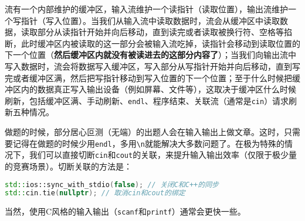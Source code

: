 流有一个内部维护的缓冲区，输入流维护一个读指针（读取位置），输出流维护一个写指针（写入位置）。当我们从输入流中读取数据时，流会从缓冲区中读取数据，读取部分从读指针开始并向后移动，直到读完或者读取被换行符、空格等掐断，此时缓冲区内被读取的这一部分会被输入流吃掉，读指针会移动到读取位置的下一个位置（\textbf{然后缓冲区内就没有被读进去的这部分内容了}）；当我们向输出流中写入数据时，流会将数据写入缓冲区，写入部分从写指针开始并向后移动，直到写完或者缓冲区满，然后把写指针移动到写入位置的下一个位置；至于什么时候把缓冲区内的数据真正写入输出设备（例如屏幕、文件等），这取决于缓冲区什么时候刷新，包括缓冲区满、手动刷新、\texttt{endl}、程序结束、关联流（通常是\texttt{cin}）请求刷新五种情况。

做题的时候，部分居心叵测（无端）的出题人会在输入输出上做文章。这时，只需要记得在做题的时候少用\texttt{endl}，多用\texttt{\textbackslash n}就能解决大多数问题了。在极为特殊的情况下，我们可以直接切断\texttt{cin}和\texttt{cout}的关联，来提升输入输出效率（仅限于极少量的竞赛场景）。切断关联的方法是：
\begin{lstlisting}[language=C++]
std::ios::sync_with_stdio(false); // 关闭C和C++的同步
std::cin.tie(nullptr); // 取消cin和cout的绑定
\end{lstlisting}
当然，使用C风格的输入输出（\texttt{scanf}和\texttt{printf}）通常会更快一些。

